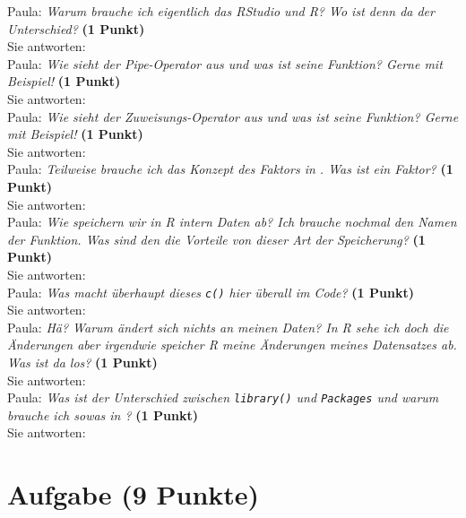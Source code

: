 \documentclass[a4paper, 9pt]{scrartcl}\usepackage[]{graphicx}\usepackage[]{xcolor}
\begin{document}
Paula: \textit{Warum brauche ich eigentlich das RStudio und R? Wo ist denn da der Unterschied?} \textbf{(1 Punkt)}\\[1ex]
Sie antworten:\\[2Ex]

Paula: \textit{Wie sieht der Pipe-Operator aus und was ist seine Funktion? Gerne mit Beispiel!} \textbf{(1 Punkt)}\\[1ex]
Sie antworten:\\[2Ex]

Paula: \textit{Wie sieht der Zuweisungs-Operator aus und was ist seine Funktion? Gerne mit Beispiel!} \textbf{(1 Punkt)}\\[1ex]
Sie antworten:\\[2Ex]

Paula: \textit{Teilweise brauche ich das Konzept des Faktors in \Rlogo. Was ist ein Faktor?} \textbf{(1 Punkt)}\\[1ex]
Sie antworten:\\[2Ex]

Paula: \textit{Wie speichern wir in R intern Daten ab? Ich brauche nochmal den Namen der Funktion. Was sind den die Vorteile von dieser Art der Speicherung?} \textbf{(1 Punkt)}\\[1ex]
Sie antworten:\\[2Ex]

Paula: \textit{Was macht überhaupt dieses \texttt{c()} hier überall im \Rlogo Code?} \textbf{(1 Punkt)}\\[1ex]
Sie antworten:\\[2Ex]

Paula: \textit{Hä? Warum ändert sich nichts an meinen Daten? In R sehe ich doch die Änderungen aber irgendwie speicher R meine Änderungen meines Datensatzes ab. Was ist da los?} \textbf{(1 Punkt)}\\[1ex]
Sie antworten:\\[2Ex]

Paula: \textit{Was ist der Unterschied zwischen \texttt{library()} und \texttt{Packages} und warum brauche ich sowas in \Rlogo?} \textbf{(1 Punkt)}\\[1ex]
Sie antworten:\\[2Ex] 
\clearpage

\section{Aufgabe \hfill (9 Punkte)}
\end{document}
